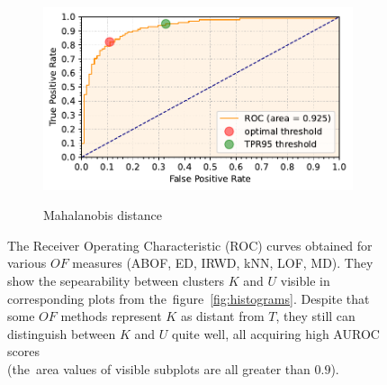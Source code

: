 \begin{figure}[t]
\begin{subfigure}[b]{0.495\textwidth}
        \label{fig:roc-lof}
    \end{subfigure}
    \hfill
    \begin{subfigure}[b]{0.495\textwidth}
        \centering
        \caption{\small Mahalanobis distance}
        \includegraphics[width=\textwidth]{images/distributions/rocs/roc-distributions-dimension_250-samples_1000-distance_8-distribution_gaussian-model_MD-seed_0.pdf}
        \label{fig:roc-mahalanobis}
    \end{subfigure}
    \caption{The Receiver Operating Characteristic (ROC) curves obtained for various $OF$ measures (ABOF, ED, IRWD, kNN, LOF, MD). They show the sepearability between clusters $K$ and $U$ visible in corresponding plots from the~figure~\ref{fig:histograms}.
    Despite that some $OF$ methods represent $K$ as distant from $T$, they still can distinguish between $K$ and $U$ quite well, all acquiring high AUROC scores \\
    (the~area values of visible subplots are all greater than $0.9$).}
    \label{fig:rocs}
\end{figure}

\cleardoublepage{}

